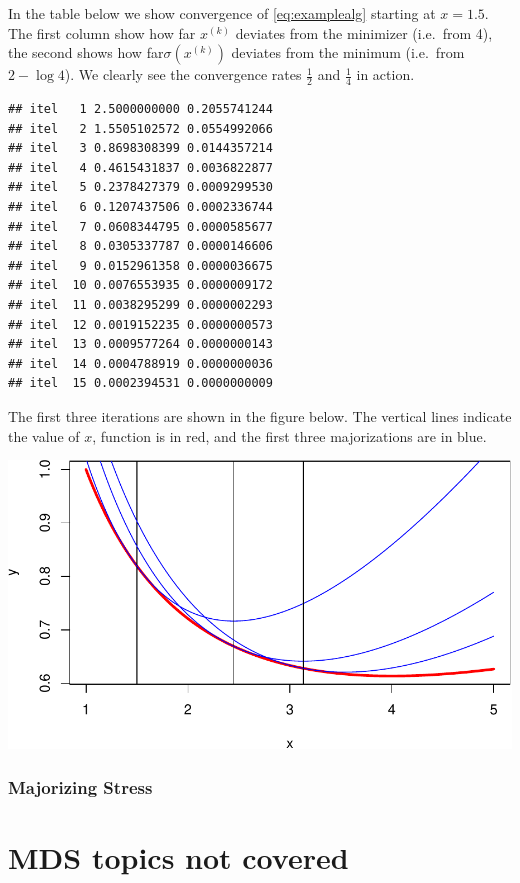 \documentclass[
  12pt,
]{article}
\begin{document}
In the table below we show convergence of \eqref{eq:examplealg} starting
at \(x=1.5\). The first column show how far \(x^{(k)}\) deviates from the
minimizer (i.e.~from 4), the second shows how far\(\sigma(x^{(k)})\)
deviates from the minimum (i.e.~from \(2-\log 4\)). We clearly see the
convergence rates \(\frac12\) and \(\frac14\) in action.

\begin{verbatim}
## itel   1 2.5000000000 0.2055741244 
## itel   2 1.5505102572 0.0554992066 
## itel   3 0.8698308399 0.0144357214 
## itel   4 0.4615431837 0.0036822877 
## itel   5 0.2378427379 0.0009299530 
## itel   6 0.1207437506 0.0002336744 
## itel   7 0.0608344795 0.0000585677 
## itel   8 0.0305337787 0.0000146606 
## itel   9 0.0152961358 0.0000036675 
## itel  10 0.0076553935 0.0000009172 
## itel  11 0.0038295299 0.0000002293 
## itel  12 0.0019152235 0.0000000573 
## itel  13 0.0009577264 0.0000000143 
## itel  14 0.0004788919 0.0000000036 
## itel  15 0.0002394531 0.0000000009
\end{verbatim}

The first three iterations are shown in the figure below. The vertical
lines indicate the value of \(x\), function is in red, and the first three
majorizations are in blue.

\begin{center}\includegraphics{smacofIntro_files/figure-latex/majplot-1} \end{center}

\subsubsection{Majorizing Stress}\label{majorizing-stress}

\section{MDS topics not covered}\label{mds-topics-not-covered}
\end{document}
